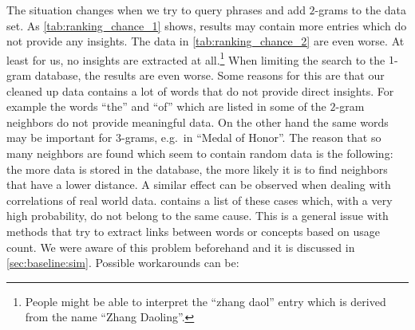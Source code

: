 The situation changes when we try to query phrases and add $2$-grams to the data set. As \autoref{tab:ranking_chance_1} shows, results may contain more entries which do not provide any insights. The data in \autoref{tab:ranking_chance_2} are even worse. At least for us, no insights are extracted at all.\footnote{People might be able to interpret the \enquote{zhang daol} entry which is derived from the name \enquote{Zhang Daoling}.} When limiting the search to the $1$-gram database, the results are even worse. Some reasons for this are that our cleaned up data contains a lot of words that do not provide direct insights. For example the words \enquote{the} and \enquote{of} which are listed in some of the $2$-gram neighbors do not provide meaningful data. On the other hand the same words may be important for $3$-grams, e.g.\ in \enquote{Medal of Honor}. The reason that so many neighbors are found which seem to contain random data is the following: the more data is stored in the database, the more likely it is to find neighbors that have a lower distance. A similar effect can be observed when dealing with correlations of real world data. \cite{correlations1} contains a list of these cases which, with a very high probability, do not belong to the same cause. This is a general issue with methods that try to extract links between words or concepts based on usage count. We were aware of this problem beforehand and it is discussed in \autoref{sec:baseline:sim}. Possible workarounds can be:

